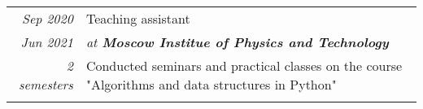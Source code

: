 \begin{center}
\begin{longtable}{r|p{17cm}}
\emph{Sep 2020} & Teaching assistant \\
\emph{Jun 2021} & \emph{at \textbf{Moscow Institue of Physics and Technology}} \\
\emph{2 semesters} & Conducted seminars and practical classes on the course "Algorithms and data structures in Python" \\
\multicolumn{2}{c}{} \\
\end{longtable}
\end{center}

